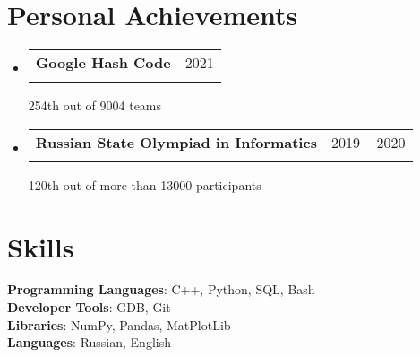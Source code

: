 \documentclass[letterpaper,11pt]{article}
\makeatletter
\newcommand{\resumeSubheading}[4]{
  \vspace{-2pt}\item
    \begin{tabular*}{0.97\textwidth}[t]{l@{\extracolsep{\fill}}r}
      \textbf{#1} & #2 \\
      \textit{\small#3} & \textit{\small #4} \\
    \end{tabular*}\vspace{-7pt}
}
\newcommand{\resumeSubHeadingListStart}{\begin{itemize}[leftmargin=0.15in, label={}]}
\newcommand{\resumeSubHeadingListEnd}{\end{itemize}}
\makeatother
\begin{document}
\section{Personal Achievements}
  \resumeSubHeadingListStart

    \resumeSubheading
      {Google Hash Code}{2021}
      {}{}
      
      \qquad\small{254th out of 9004 teams}
      
    \resumeSubheading
      {Russian State Olympiad in Informatics}{2019 -- 2020}
      {}{}
      
      \qquad\small{120th out of more than 13000 participants}

    \resumeSubHeadingListEnd

\section{Skills}
 \begin{itemize}[leftmargin=0.15in, label={}]
    \small{\item{
     \textbf{Programming Languages}{: C++, Python, SQL, Bash} \\
     \textbf{Developer Tools}{: GDB, Git} \\
     \textbf{Libraries}{: NumPy, Pandas, MatPlotLib} \\
     \textbf{Languages}{: Russian, English}
    }}
 \end{itemize}
\end{document}
